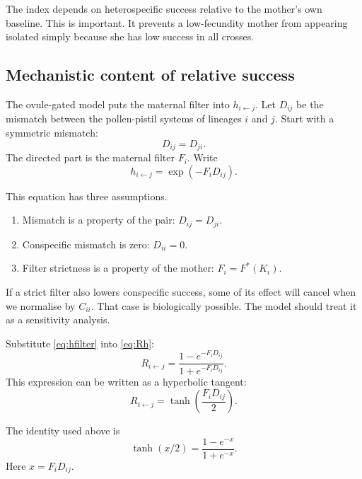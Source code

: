 \documentclass[12pt]{article}
\begin{document}
\begin{conclusionbox}
The index depends on heterospecific success relative to the mother's own baseline. This is important. It prevents a low-fecundity mother from appearing isolated simply because she has low success in all crosses.
\end{conclusionbox}

\subsection{Mechanistic content of relative success}

The ovule-gated model puts the maternal filter into $h_{i\leftarrow j}$. Let $D_{ij}$ be the mismatch between the pollen-pistil systems of lineages $i$ and $j$. Start with a symmetric mismatch:
\begin{equation}
D_{ij}=D_{ji}.
\end{equation}
The directed part is the maternal filter $F_i$. Write
\begin{equation}
h_{i\leftarrow j}=\exp(-F_iD_{ij}).
\label{eq:hfilter}
\end{equation}

This equation has three assumptions.

\begin{enumerate}
\item Mismatch is a property of the pair: $D_{ij}=D_{ji}$.
\item Conspecific mismatch is zero: $D_{ii}=0$.
\item Filter strictness is a property of the mother: $F_i=F^*(K_i)$.
\end{enumerate}

If a strict filter also lowers conspecific success, some of its effect will cancel when we normalise by $C_{ii}$. That case is biologically possible. The model should treat it as a sensitivity analysis.

Substitute \eqref{eq:hfilter} into \eqref{eq:Rh}:
\begin{equation}
R_{i\leftarrow j}=\frac{1-e^{-F_iD_{ij}}}{1+e^{-F_iD_{ij}}}.
\label{eq:Rfilter}
\end{equation}
This expression can be written as a hyperbolic tangent:
\begin{equation}
R_{i\leftarrow j}=\tanh\left(\frac{F_iD_{ij}}{2}\right).
\label{eq:tanhR}
\end{equation}

\begin{rulebox}
The identity used above is
\[
\tanh(x/2)=\frac{1-e^{-x}}{1+e^{-x}}.
\]
Here $x=F_iD_{ij}$.
\end{rulebox}
\end{document}
